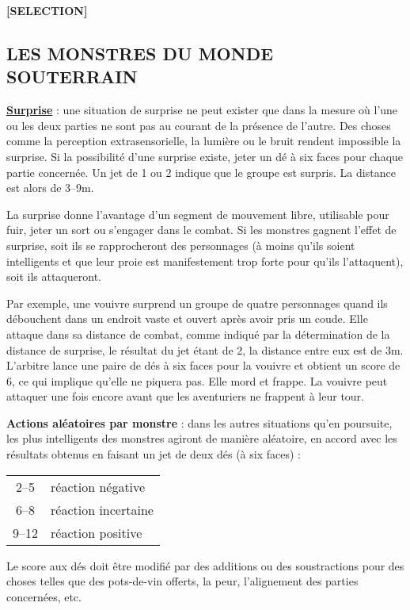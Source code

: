 \begin{center}
\textbf{[SELECTION]}
\end{center}

\subsection*{LES MONSTRES DU MONDE SOUTERRAIN}

\label{dd3-surprise}\textbf{\uline{Surprise}} : une situation de surprise ne peut exister que dans la mesure où l'une ou les deux parties ne sont pas au courant de la présence de l'autre. Des choses comme la perception extrasensorielle, la lumière ou le bruit rendent impossible la surprise. Si la possibilité d'une surprise existe, jeter un dé à six faces pour chaque partie concernée. Un jet de 1 ou 2 indique que le groupe est surpris. La distance est alors de 3--9m.

\bigskip

La surprise donne l'avantage d'un segment de mouvement libre, utilisable pour fuir, jeter un sort ou s'engager dans le combat. Si les monstres gagnent l'effet de surprise, soit ils se rapprocheront des personnages (à moins qu'ils soient intelligents et que leur proie est manifestement trop forte pour qu'ils l'attaquent), soit ils attaqueront.

\bigskip

Par exemple, une vouivre surprend un groupe de quatre personnages quand ils débouchent dans un endroit vaste et ouvert après avoir pris un coude. Elle attaque dans sa distance de combat, comme indiqué par la détermination de la distance de surprise, le résultat du jet étant de 2, la distance entre eux est de 3m. L'arbitre lance une paire de dés à six faces pour la vouivre et obtient un score de 6, ce qui implique qu'elle ne piquera pas. Elle mord et frappe. La vouivre peut attaquer une fois encore avant que les aventuriers ne frappent à leur tour.

\bigskip

\label{dd3-actions-monstres}\textbf{Actions aléatoires par monstre} : dans les autres situations qu'en poursuite, les plus intelligents des monstres agiront de manière aléatoire, en accord avec les résultats obtenus en faisant un jet de deux dés (à six faces) :

\bigskip

{\parindent6cm \begin{tabular}{cl}
2--5 & réaction négative \\
6--8 & réaction incertaine \\
9--12 & réaction positive \\
\end{tabular}}

\medskip

Le score aux dés doit être modifié par des additions ou des soustractions pour des choses telles que des pots-de-vin offerts, la peur, l'alignement des parties concernées, etc.


